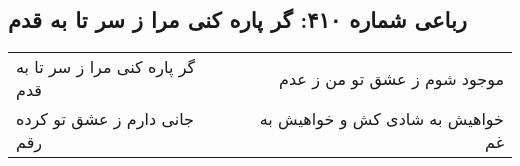 \begin{center}
\section*{رباعی شماره ۴۱۰: گر پاره کنی مرا ز سر تا به قدم}
\label{sec:sh410}
\begin{longtable}{l p{0.5cm} r}
گر پاره کنی مرا ز سر تا به قدم
&&
موجود شوم ز عشق تو من ز عدم
\\
جانی دارم ز عشق تو کرده رقم
&&
خواهیش به شادی کش و خواهیش به غم
\\
\end{longtable}
\end{center}
